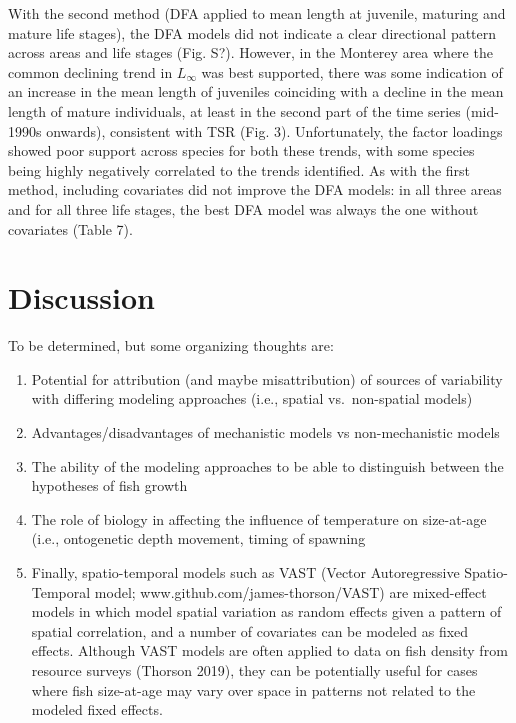\documentclass[
]{article}
\begin{document}
With the second method (DFA applied to mean length at juvenile, maturing
and mature life stages), the DFA models did not indicate a clear
directional pattern across areas and life stages (Fig. S?). However, in
the Monterey area where the common declining trend in \(L_{\infty}\) was
best supported, there was some indication of an increase in the mean
length of juveniles coinciding with a decline in the mean length of
mature individuals, at least in the second part of the time series
(mid-1990s onwards), consistent with TSR (Fig. 3). Unfortunately, the
factor loadings showed poor support across species for both these
trends, with some species being highly negatively correlated to the
trends identified. As with the first method, including covariates did
not improve the DFA models: in all three areas and for all three life
stages, the best DFA model was always the one without covariates (Table
7).

\hypertarget{discussion}{%
\section{Discussion}\label{discussion}}

To be determined, but some organizing thoughts are:

\begin{enumerate}
\def\labelenumi{\arabic{enumi})}
\item
  Potential for attribution (and maybe misattribution) of sources of
  variability with differing modeling approaches (i.e., spatial
  vs.~non-spatial models)
\item
  Advantages/disadvantages of mechanistic models vs non-mechanistic
  models
\item
  The ability of the modeling approaches to be able to distinguish
  between the hypotheses of fish growth
\item
  The role of biology in affecting the influence of temperature on
  size-at-age (i.e., ontogenetic depth movement, timing of spawning
\item
  Finally, spatio-temporal models such as VAST (Vector Autoregressive
  Spatio-Temporal model; www.github.com/james-thorson/VAST) are
  mixed-effect models in which model spatial variation as random effects
  given a pattern of spatial correlation, and a number of covariates can
  be modeled as fixed effects. Although VAST models are often applied to
  data on fish density from resource surveys (Thorson 2019), they can be
  potentially useful for cases where fish size-at-age may vary over
  space in patterns not related to the modeled fixed effects.
\end{enumerate}
\end{document}
